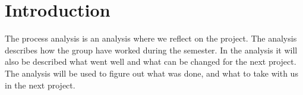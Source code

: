 \chapter{Introduction}
The process analysis is an analysis where we reflect on the project. The analysis describes how the group have worked during the semester. In the analysis it will also be described what went well and what can be changed for the next project. The analysis will be used to figure out what was done, and what to take with us in the next project.